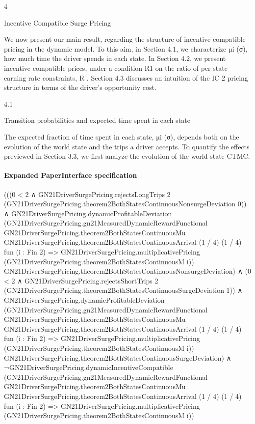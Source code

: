\documentclass[10pt]{article}
\begin{document}
\begin{ReviewVerbatim}
4

Incentive Compatible Surge Pricing

We now present our main result, regarding the structure of incentive compatible pricing in the
dynamic model. To this aim, in Section 4.1, we characterize µi (σ), how much time the driver
spends in each state. In Section 4.2, we present incentive compatible prices, under a condition
R1
on the ratio of per-state earning rate constraints, R
. Section 4.3 discusses an intuition of the IC
2
pricing structure in terms of the driver’s opportunity cost.

4.1

Transition probabilities and expected time spent in each state

The expected fraction of time spent in each state, µi (σ), depends both on the evolution of the
world state and the trips a driver accepts. To quantify the effects previewed in Section 3.3, we first
analyze the evolution of the world state CTMC.
\end{ReviewVerbatim}



\paragraph{Expanded PaperInterface specification}
\begin{ReviewVerbatim}
(((0 < 2 ∧
        GN21DriverSurgePricing.rejectsLongTrips 2
          (GN21DriverSurgePricing.theorem2BothStatesContinuousNonsurgeDeviation 0)) ∧
      GN21DriverSurgePricing.dynamicProfitableDeviation
        (GN21DriverSurgePricing.gn21MeasuredDynamicRewardFunctional
          GN21DriverSurgePricing.theorem2BothStatesContinuousMu
          GN21DriverSurgePricing.theorem2BothStatesContinuousArrival (1 / 4) (1 / 4) fun (i : Fin 2) =>
          GN21DriverSurgePricing.multiplicativePricing (GN21DriverSurgePricing.theorem2BothStatesContinuousM i))
        GN21DriverSurgePricing.theorem2BothStatesContinuousNonsurgeDeviation) ∧
    (0 < 2 ∧
        GN21DriverSurgePricing.rejectsShortTrips 2
          (GN21DriverSurgePricing.theorem2BothStatesContinuousSurgeDeviation 1)) ∧
      GN21DriverSurgePricing.dynamicProfitableDeviation
        (GN21DriverSurgePricing.gn21MeasuredDynamicRewardFunctional
          GN21DriverSurgePricing.theorem2BothStatesContinuousMu
          GN21DriverSurgePricing.theorem2BothStatesContinuousArrival (1 / 4) (1 / 4) fun (i : Fin 2) =>
          GN21DriverSurgePricing.multiplicativePricing (GN21DriverSurgePricing.theorem2BothStatesContinuousM i))
        GN21DriverSurgePricing.theorem2BothStatesContinuousSurgeDeviation) ∧
  ¬GN21DriverSurgePricing.dynamicIncentiveCompatible
      (GN21DriverSurgePricing.gn21MeasuredDynamicRewardFunctional GN21DriverSurgePricing.theorem2BothStatesContinuousMu
        GN21DriverSurgePricing.theorem2BothStatesContinuousArrival (1 / 4) (1 / 4) fun (i : Fin 2) =>
        GN21DriverSurgePricing.multiplicativePricing (GN21DriverSurgePricing.theorem2BothStatesContinuousM i))
\end{ReviewVerbatim}
\end{document}
